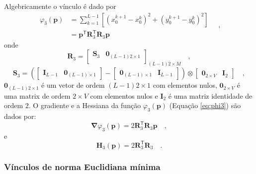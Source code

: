 Algebricamente o vínculo é dado por
\begin{equation}\label{eq:phi3}
\begin{split}
\varphi_{3}(\mathbf{p}) &= \sum\limits^{L-1}_{k=1}\left[\left(x_{0}^{k+1} - x_{0}^{k}\right)^2 + \left(y_{0}^{k+1} - y_{0}^{k}\right)^2 \right] \\
&= \mathbf{p}^{\mathsf{T}} \mathbf{R}^{\mathsf{T}}_{3}\mathbf{R}_{3}\mathbf{p}
\end{split} \quad ,
\end{equation}
onde 
\begin{equation}
\mathbf{R}_{3} = 
\begin{bmatrix}
\mathbf{S}_{3} & \mathbf{0}_{(L-1)2 \times 1} \\
\end{bmatrix}_{(L-1)2 \times M} \quad ,
\label{eq:R3-matrix}
\end{equation}
\begin{equation}
\mathbf{S}_{3} =
\left( 
\begin{bmatrix} \mathbf{I}_{L-1} & \mathbf{0}_{(L-1) \times 1} \end{bmatrix} -
\begin{bmatrix} \mathbf{0}_{(L-1) \times 1} & \mathbf{I}_{L-1} \end{bmatrix} 
\right) \otimes 
\begin{bmatrix} \mathbf{0}_{2 \times V} & \mathbf{I}_{2} \end{bmatrix} \quad ,
\label{eq:S3-matrix}
\end{equation}
$\mathbf{0}_{(L-1)2 \times 1}$ é um vetor de ordem $(L-1)2 \times 1$ com elementos nulos,
$\mathbf{0}_{2 \times V}$ é uma matrix de ordem $2 \times V$ com elementos nulos e 
$\mathbf{I}_{2}$ é uma matriz identidade de ordem $2$. O gradiente e a Hessiana da função $\varphi_{3}(\mathbf{p})$ (Equação \ref{eq:phi3}) são dados por:
\begin{equation}\label{eq:phi3_grad}
\boldsymbol{\nabla}\varphi_{3}(\mathbf{p}) = 2 \mathbf{R}^{\mathsf{T}}_{3}\mathbf{R}_{3}\mathbf{p} \quad ,
\end{equation}
e
\begin{equation}\label{eq:phi3_hessian}
\mathbf{H}_{3}(\mathbf{p}) = 2 \mathbf{R}^{\mathsf{T}}_{3}\mathbf{R}_{3} \quad .
\end{equation}

\subsubsection{Vínculos de norma Euclidiana mínima}


